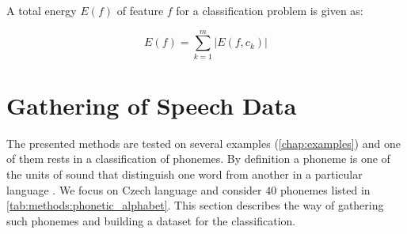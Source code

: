 A total energy $ E(f) $ of feature $ f $ for a classification problem is given as:

\begin{equation} \label{eq:feature_energy_total}
E(f) = \displaystyle{\sum_{k=1}^{m} | E(f,c_k)} |
\end{equation}

\newpage
\section{Gathering of Speech Data} \label{sec:speech_data_gathering}
The presented methods are tested on several examples (\cref{chap:examples}) and one of them rests in a classification of phonemes. By definition a phoneme is one of the units of sound that distinguish one word from another in a particular language \citep{wiki}. We focus on Czech language and consider $ 40 $ phonemes listed in \cref{tab:methods:phonetic_alphabet}. This section describes the way of gathering such phonemes and building a dataset for the classification.

